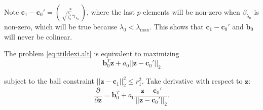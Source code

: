 Note $\boldsymbol c_1-\boldsymbol c_0'=\binom{*}{\sqrt{\frac{\lambda_1}{\lambda_0}}\boldsymbol\gamma_{\lambda_0}}$, where the last $p$ elements will be non-zero when $\beta_{\lambda_0}$ is non-zero, which will be true because $\lambda_0<\lambda_{\max}$. This shows that $\boldsymbol c_1-\boldsymbol c_0'$ and $\boldsymbol b_0$ will never be colinear.

The problem \eqref{eq:ttildexi.alt} is equivalent to maximizing
\begin{equation}
    \label{eq:2.2.1}
    \boldsymbol b_0^T\boldsymbol z+a_0||\boldsymbol z-\boldsymbol c_0'||_2
\end{equation}

subject to the ball constraint $||\boldsymbol z-\boldsymbol c_1||_2^2\leq r_1^2$.
Take derivative with respect to $\boldsymbol z$:
\begin{equation}
    \label{eq:2.2.2}
    \frac{\partial}{\partial\boldsymbol z}=\boldsymbol b_0^T+a_0\frac{\boldsymbol z-\boldsymbol c_0'}{||\boldsymbol z-\boldsymbol c_0'||_2}.
\end{equation}

